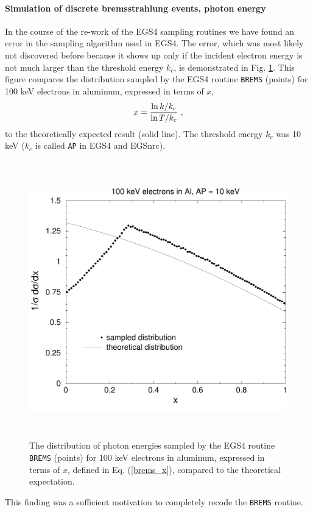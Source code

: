 \paragraph{Simulation of discrete bremsstrahlung events, photon energy}
\hfill
{}


In the course of the re-work of the EGS4 sampling routines 
we have found an error in the sampling algorithm used in 
EGS4. The error, which was most likely not discovered before 
because it shows up only if the incident electron energy is 
not much larger than the threshold energy $k_c$, is 
demonstrated in Fig. \ref{brems_fig2}. This figure compares the distribution 
sampled by the EGS4 routine {\tt BREMS} (points) for 100 keV 
electrons in aluminum, expressed in 
terms of $x$,
\begin{equation}
\label{brems_x}
x = {\ln k/k_c \over \ln T/k_c}~,
\end{equation}
to the theoretically expected result (solid line). The threshold 
energy $k_c$ was 10 keV ($k_c$ is called {\tt AP} in EGS4 and EGSnrc).  
\begin{figure}[htp]
\includegraphics[height=12cm,width=12cm]{figures/Al_100keV}
\caption[{\tt BREMS} bug in EGS4]{\label{brems_fig2} 
The distribution of photon energies 
sampled by the EGS4 routine {\tt BREMS} (points) for 100 keV 
electrons in aluminum, expressed in terms of $x$, defined in 
Eq. (\protect\ref{brems_x}), compared to the theoretical 
expectation.}
\end{figure}
This finding was a sufficient motivation to completely recode 
the {\tt BREMS} routine.

